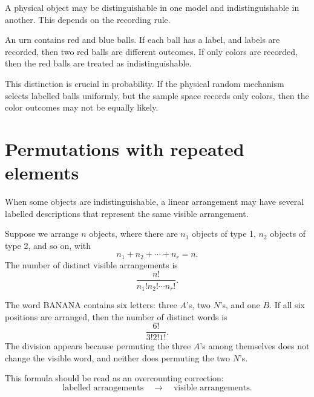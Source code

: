 A physical object may be distinguishable in one model and indistinguishable in another. This depends on the recording rule.

\begin{examplebox}
An urn contains red and blue balls. If each ball has a label, and labels are recorded, then two red balls are different outcomes. If only colors are recorded, then the red balls are treated as indistinguishable.
\end{examplebox}

This distinction is crucial in probability. If the physical random mechanism selects labelled balls uniformly, but the sample space records only colors, then the color outcomes may not be equally likely.

\section{Permutations with repeated elements}

When some objects are indistinguishable, a linear arrangement may have several labelled descriptions that represent the same visible arrangement.

Suppose we arrange \(n\) objects, where there are \(n_1\) objects of type 1, \(n_2\) objects of type 2, and so on, with
\[
n_1+n_2+\cdots+n_r=n.
\]
The number of distinct visible arrangements is
\[
\frac{n!}{n_1!n_2!\cdots n_r!}.
\]

\begin{examplebox}
The word \(\text{BANANA}\) contains six letters: three \(A\)'s, two \(N\)'s, and one \(B\). If all six positions are arranged, then the number of distinct words is
\[
\frac{6!}{3!2!1!}.
\]
The division appears because permuting the three \(A\)'s among themselves does not change the visible word, and neither does permuting the two \(N\)'s.
\end{examplebox}

This formula should be read as an overcounting correction:
\[
\text{labelled arrangements}
\quad \longrightarrow \quad
\text{visible arrangements}.
\]
